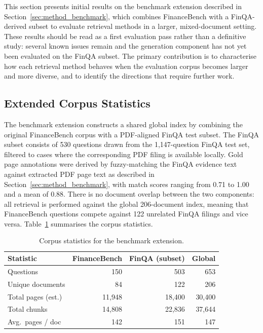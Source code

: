 \documentclass[12pt,twoside,maitrise]{dms}
\theoremstyle{definition}
\numberwithin{equation}{section}
\numberwithin{table}{chapter}
\numberwithin{figure}{chapter}
\begin{document}
This section presents initial results on the benchmark extension described in
Section~\ref{sec:method_benchmark}, which combines FinanceBench with a FinQA-derived
subset to evaluate retrieval methods in a larger, mixed-document setting. These results
should be read as a first evaluation pass rather than a definitive study: several known
issues remain and the generation component has not yet been evaluated on the FinQA
subset. The primary contribution is to characterise how each retrieval method behaves
when the evaluation corpus becomes larger and more diverse, and to identify the
directions that require further work.

\subsection{Extended Corpus Statistics}
\label{sec:extension_corpus}

The benchmark extension constructs a shared global index by combining the original
FinanceBench corpus with a PDF-aligned FinQA test subset. The FinQA subset consists of
530 questions drawn from the 1,147-question FinQA test set, filtered to cases where the
corresponding PDF filing is available locally. Gold page annotations were derived by
fuzzy-matching the FinQA evidence text against extracted PDF page text as described in
Section~\ref{sec:method_benchmark}, with match scores ranging from 0.71 to 1.00 and a
mean of 0.88. There is no document overlap between the two components: all retrieval
is performed against the global 206-document index, meaning that FinanceBench questions
compete against 122 unrelated FinQA filings and vice versa. Table~\ref{tab:extension_stats}
summarises the corpus statistics.

\begin{table}[ht]
\centering

\small
\begin{tabular}{lrrr}
\toprule
\textbf{Statistic} & \textbf{FinanceBench} & \textbf{FinQA (subset)} & \textbf{Global} \\
\midrule
Questions          & 150    & 503     & 653    \\
Unique documents   & 84     & 122     & 206    \\
Total pages (est.) & 11,948 & 18,400  & 30,400 \\
Total chunks       & 14,808 & 22,836  & 37,644 \\
Avg.\ pages / doc  & 142    & 151     & 147    \\
\bottomrule
\end{tabular}
\caption{Corpus statistics for the benchmark extension.}
\label{tab:extension_stats}
\end{table}
\end{document}
